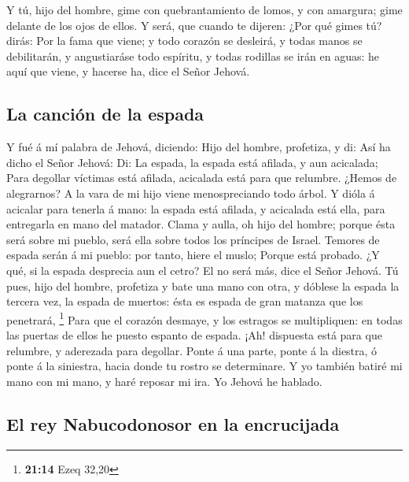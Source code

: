  Y tú, hijo del hombre, gime con quebrantamiento de lomos, y
con amargura; gime delante de los ojos de ellos.  Y será,
que cuando te dijeren: ¿Por qué gimes tú? dirás: Por la fama que viene;
y todo corazón se desleirá, y todas manos se debilitarán, y angustiaráse
todo espíritu, y todas rodillas se irán en aguas: he aquí que viene, y
hacerse ha, dice el Señor Jehová.

\hypertarget{la-canciuxf3n-de-la-espada}{%
\subsection{La canción de la espada}\label{la-canciuxf3n-de-la-espada}}

 Y fué á mí palabra de Jehová, diciendo:  Hijo
del hombre, profetiza, y di: Así ha dicho el Señor Jehová: Di: La
espada, la espada está afilada, y aun acicalada;  Para
degollar víctimas está afilada, acicalada está para que relumbre. ¿Hemos
de alegrarnos? A la vara de mi hijo viene menospreciando todo árbol.
 Y dióla á acicalar para tenerla á mano: la espada está
afilada, y acicalada está ella, para entregarla en mano del matador.
 Clama y aulla, oh hijo del hombre; porque ésta será sobre
mi pueblo, será ella sobre todos los príncipes de Israel. Temores de
espada serán á mi pueblo: por tanto, hiere el muslo; 
Porque está probado. ¿Y qué, si la espada desprecia aun el cetro? El no
será más, dice el Señor Jehová.  Tú pues, hijo del hombre,
profetiza y bate una mano con otra, y dóblese la espada la tercera vez,
la espada de muertos: ésta es espada de gran matanza que los penetrará,
\footnote{\textbf{21:14} Ezeq 32,20}  Para que el corazón
desmaye, y los estragos se multipliquen: en todas las puertas de ellos
he puesto espanto de espada. ¡Ah! dispuesta está para que relumbre, y
aderezada para degollar.  Ponte á una parte, ponte á la
diestra, ó ponte á la siniestra, hacia donde tu rostro se determinare.
 Y yo también batiré mi mano con mi mano, y haré reposar mi
ira. Yo Jehová he hablado.

\hypertarget{el-rey-nabucodonosor-en-la-encrucijada}{%
\subsection{El rey Nabucodonosor en la
encrucijada}\label{el-rey-nabucodonosor-en-la-encrucijada}}

